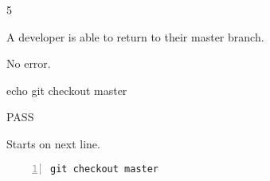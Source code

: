 \begin{description}[align=right,leftmargin=3.2cm,labelindent=3.0cm]
\item[Step:] 5
\item[Confirm:] A developer is able to return to their master branch.
\item[Expectation:] No error.
\item[Command:] echo git  checkout master
\item[Test Result:] PASS
\item[Evidence:] Starts on next line.
\end{description}
\begin{lstlisting}[numbers=left]
git checkout master

\end{lstlisting}
